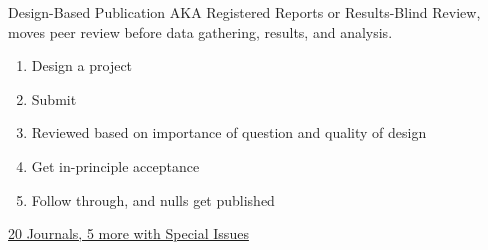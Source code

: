 \documentclass{beamer}
\begin{document}
\begin{frame}{Design-Based Publication}
AKA Registered Reports or Results-Blind Review, moves peer review before data gathering, results, and analysis.

\begin{enumerate}[<.->]
\item Design a project
\item Submit
\item Reviewed based on importance of question and quality of design
\item Get in-principle acceptance
\item Follow through, and nulls get published
\end{enumerate}
\href{https://osf.io/8mpji/wiki/home/}{20 Journals, 5 more with Special Issues }
\end{frame}

 { %
    \begin{frame}[plain, label=AEAreg]
     \end{frame}
}


\end{document}

